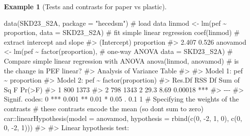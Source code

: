 \documentclass[
  11pt,
  letterpaper,
]{scrbook}
\newenvironment{Shaded}{\begin{snugshade}}{\end{snugshade}}
\newcommand{\AttributeTok}[1]{\textcolor[rgb]{0.40,0.45,0.13}{#1}}
\newcommand{\CommentTok}[1]{\textcolor[rgb]{0.37,0.37,0.37}{#1}}
\newcommand{\DecValTok}[1]{\textcolor[rgb]{0.68,0.00,0.00}{#1}}
\newcommand{\FunctionTok}[1]{\textcolor[rgb]{0.28,0.35,0.67}{#1}}
\newcommand{\NormalTok}[1]{\textcolor[rgb]{0.00,0.23,0.31}{#1}}
\newcommand{\OtherTok}[1]{\textcolor[rgb]{0.00,0.23,0.31}{#1}}
\newcommand{\SpecialCharTok}[1]{\textcolor[rgb]{0.37,0.37,0.37}{#1}}
\newcommand{\StringTok}[1]{\textcolor[rgb]{0.13,0.47,0.30}{#1}}
\theoremstyle{plain}
\theoremstyle{plain}
\theoremstyle{definition}
\newtheorem{example}{Example}[chapter]
\theoremstyle{definition}
\theoremstyle{remark}
\begin{document}
\begin{example}[Tests and contrasts for paper vs
plastic]
\begin{Shaded}
\begin{Highlighting}[]
\FunctionTok{data}\NormalTok{(SKD23\_S2A, }\AttributeTok{package =} \StringTok{"hecedsm"}\NormalTok{) }\CommentTok{\# load data}
\NormalTok{linmod }\OtherTok{\textless{}{-}} \FunctionTok{lm}\NormalTok{(pef }\SpecialCharTok{\textasciitilde{}}\NormalTok{ proportion, }\AttributeTok{data =}\NormalTok{ SKD23\_S2A) }\CommentTok{\# fit simple linear regression}
\FunctionTok{coef}\NormalTok{(linmod) }\CommentTok{\# extract intercept and slope}
\CommentTok{\#\textgreater{} (Intercept)  proportion }
\CommentTok{\#\textgreater{}       2.407       0.526}
\NormalTok{anovamod }\OtherTok{\textless{}{-}} \FunctionTok{lm}\NormalTok{(pef }\SpecialCharTok{\textasciitilde{}} \FunctionTok{factor}\NormalTok{(proportion), }\CommentTok{\# one{-}way ANOVA}
               \AttributeTok{data =}\NormalTok{ SKD23\_S2A) }
\CommentTok{\# Compare simple linear regression with ANOVA}
\FunctionTok{anova}\NormalTok{(linmod, anovamod) }\CommentTok{\# is the change in PEF linear?}
\CommentTok{\#\textgreater{} Analysis of Variance Table}
\CommentTok{\#\textgreater{} }
\CommentTok{\#\textgreater{} Model 1: pef \textasciitilde{} proportion}
\CommentTok{\#\textgreater{} Model 2: pef \textasciitilde{} factor(proportion)}
\CommentTok{\#\textgreater{}   Res.Df  RSS Df Sum of Sq    F  Pr(\textgreater{}F)    }
\CommentTok{\#\textgreater{} 1    800 1373                              }
\CommentTok{\#\textgreater{} 2    798 1343  2      29.3 8.69 0.00018 ***}
\CommentTok{\#\textgreater{} {-}{-}{-}}
\CommentTok{\#\textgreater{} Signif. codes:  0 \textquotesingle{}***\textquotesingle{} 0.001 \textquotesingle{}**\textquotesingle{} 0.01 \textquotesingle{}*\textquotesingle{} 0.05 \textquotesingle{}.\textquotesingle{} 0.1 \textquotesingle{} \textquotesingle{} 1}
\CommentTok{\# Specifying the weights of the contrasts}
\CommentTok{\# these contrasts encode the mean (so don\textquotesingle{}t sum to zero)}
\NormalTok{car}\SpecialCharTok{::}\FunctionTok{linearHypothesis}\NormalTok{(}\AttributeTok{model =}\NormalTok{ anovamod, }
   \AttributeTok{hypothesis =} \FunctionTok{rbind}\NormalTok{(}\FunctionTok{c}\NormalTok{(}\DecValTok{0}\NormalTok{, }\SpecialCharTok{{-}}\DecValTok{2}\NormalTok{, }\DecValTok{1}\NormalTok{, }\DecValTok{0}\NormalTok{), }
                      \FunctionTok{c}\NormalTok{(}\DecValTok{0}\NormalTok{, }\DecValTok{0}\NormalTok{, }\SpecialCharTok{{-}}\DecValTok{2}\NormalTok{, }\DecValTok{1}\NormalTok{)))}
\CommentTok{\#\textgreater{} }
\CommentTok{\#\textgreater{} Linear hypothesis test:}

\end{Highlighting}
\end{Shaded}
\end{example}
\end{document}
